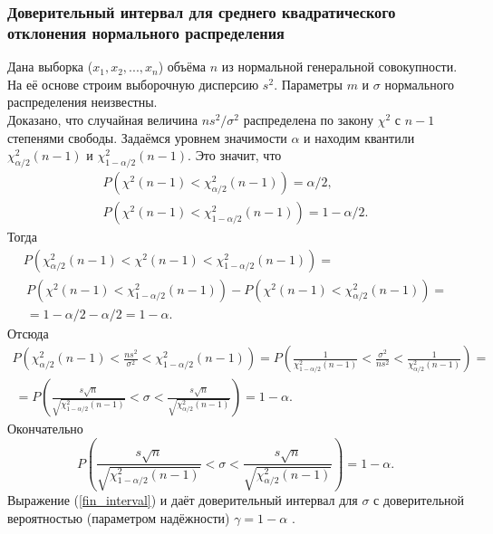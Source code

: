\documentclass[../body.tex]{subfiles}
\begin{document}
\subsubsection{Доверительный интервал для среднего квадратического отклонения нормального распределения}
Дана выборка ($x_{1},x_{2}, ... ,x_{n}$) объёма $n$ из нормальной генеральной совокупности. На её основе строим выборочную дисперсию $s^{2}$. Параметры $m$ и $\sigma$ нормального распределения неизвестны.\\ Доказано, что случайная величина $ns^{2}/\sigma^{2}$ распределена по закону $\chi^{2}$ с $n-1$ степенями свободы.
\newline
Задаёмся уровнем значимости $\alpha$ и находим квантили $\chi^{2}_{\alpha/2}(n-1)$ и $\chi^{2}_{1-\alpha/2}(n-1)$.
\newline
Это значит, что 
\begin{equation}
	\begin{split}
		P\left(\chi^{2}(n-1) < \chi^{2}_{\alpha/2}(n-1)\right) = \alpha/2, \\
		P\left(\chi^{2}(n-1) < \chi^{2}_{1-\alpha/2}(n-1)\right) = 1-\alpha/2.
		\label{P_chi_2x2} 
	\end{split}
\end{equation}
Тогда
\begin{multline}
P\left(\chi^{2}_{\alpha/2}(n-1) < \chi^{2}(n-1) < \chi^{2}_{1-\alpha/2}(n-1)\right) = \\\
P\left(\chi^{2}(n-1) < \chi^{2}_{1-\alpha/2}(n-1)\right) -P\left(\chi^{2}(n-1) < \chi^{2}_{\alpha/2}(n-1)\right) = \\\ = 1 - \alpha/2 -\alpha/2 = 1 - \alpha.
\label{P_chi_2}
\end{multline}
Отсюда
\begin{multline}
	P\left(\chi^{2}_{\alpha/2}(n-1) < \frac{ns^{2}}{\sigma^{2}} < \chi^{2}_{1-\alpha/2}(n-1)\right) =
	P\left(\frac{1}{\chi^{2}_{1-\alpha/2}(n-1)} < \frac{\sigma^{2}}{ns^{2}} < \frac{1}{\chi^{2}_{\alpha/2}(n-1)} \right) = \\\ =
	P\left(\frac{s\sqrt{n}}{\sqrt{\chi^{2}_{1-\alpha/2}(n-1)}} < \sigma <  \frac{s\sqrt{n}}{\sqrt{\chi^{2}_{\alpha/2}(n-1)}}\right) = 1- \alpha.
	\label{interv}
\end{multline}
Окончательно
\begin{equation}
	P\left(\frac{s\sqrt{n}}{\sqrt{\chi^{2}_{1-\alpha/2}(n-1)}} < \sigma <  \frac{s\sqrt{n}}{\sqrt{\chi^{2}_{\alpha/2}(n-1)}}\right) = 1- \alpha.
	\label{fin_interval}
\end{equation}
Выражение (\ref{fin_interval}) и даёт доверительный интервал для $\sigma$ с доверительной вероятностью (параметром надёжности) $\gamma = 1 - \alpha$ \cite[c.~458-459]{max}.
\end{document}

